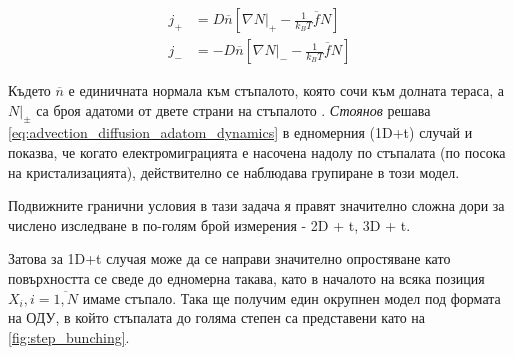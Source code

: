\begin{align*}
	j_+  &= D \overline{n} \left[ \nabla N|_+ - \frac{1}{k_B T} \overline{f} N \right] \\
	j_-  &= - D \overline{n} \left[ \nabla N|_- - \frac{1}{k_B T} \overline{f} N \right] 
\end{align*}

Където $\overline{n}$ е единичната нормала към стъпалото, която сочи към долната тераса, а  $N|_\pm$ са броя адатоми от двете страни на стъпалото \cite{Krug2005}.
\textit{Стоянов} \cite{StoyanStoyanov1991} решава \autoref{eq:advection_diffusion_adatom_dynamics} в едномерния (1D+t) случай и показва, че когато електромиграцията е насочена надолу по стъпалата (по посока на кристализацията), действително се наблюдава групиране в този модел. 

Подвижните гранични условия в тази задача я правят значително сложна дори за числено изследване в по-голям брой измерения - 2D + t, 3D + t. 

Затова за 1D+t случая може да се направи значително опростяване като повърхността се сведе до едномерна такава, като в началото на всяка позиция $X_i, i = \overline{1,N}$ имаме стъпало. Така ще получим един окрупнен модел под формата на ОДУ, в който стъпалата до голяма степен са представени като на \autoref{fig:step_bunching}.

